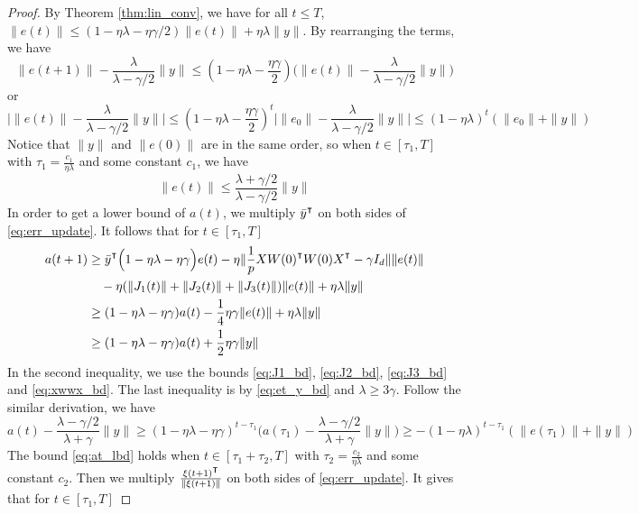 \begin{proof}
By Theorem \ref{thm:lin_conv}, we have for all $t\leq T$, $\|e(t)\|\leq(1-\eta\lambda-\eta\gamma/2)\|e(t)\|+\eta\lambda\|y\|$. By rearranging the terms, we have
\begin{equation*}
    \|e(t+1)\| -\frac{\lambda }{\lambda - \gamma/2}\|y\| \leq (1-\eta\lambda-\frac{\eta\gamma}{2})\Big(\|e(t)\| -\frac{\lambda }{\lambda - \gamma/2}\|y\|\Big)
\end{equation*}
or
\begin{equation*}
\Big|\|e(t)\| -\frac{\lambda }{\lambda - \gamma/2}\|y\|\Big|\leq (1-\eta\lambda-\frac{\eta\gamma}{2})^t \Big|\|e_0\|- \frac{\lambda }{\lambda - \gamma/2}\|y\|\Big| \leq (1-\eta\lambda)^t(\|e_0\|+\|y\|)
\end{equation*}
Notice that $\|y\|$ and $\|e(0)\|$ are in the same order, so when $t\in [\tau_1,T]$ with $\tau_1 = \frac{c_1}{\eta\lambda}$ and some constant $c_1$, we have
\begin{equation}
\label{eq:et_y_bd}
\|e(t)\|\leq \frac{\lambda+\gamma/2}{\lambda-\gamma/2} \|y\|
\end{equation}
In order to get a lower bound of $a(t)$, we multiply $\bar{y}\transpose$ on both sides of \eqref{eq:err_update}. It follows that for $t\in [\tau_1,T]$
\begin{equation*}
\begin{aligned}
a(t+1)
&\geq \bar{y}\transpose\Big(1-\eta\lambda-\eta\gamma\Big)e(t) - \eta\|\frac{1}{p}XW(0)\transpose W(0)X\transpose-\gamma I_d\|\|e(t)\|\\
&\quad-\eta(\|J_1(t)\|+\|J_2(t)\|+\|J_3(t)\|)\|e(t)\| +\eta\lambda\|y\|  \\
&\geq (1-\eta\lambda-\eta\gamma)a(t)- \frac{1}{4}\eta\gamma \|e(t)\| +\eta\lambda\|y\| \\
&\geq (1-\eta\lambda-\eta\gamma)a(t)+\frac{1}{2}\eta\gamma\|y\|
\end{aligned}
\end{equation*}
In the second inequality, we use the bounds \eqref{eq:J1_bd}, \eqref{eq:J2_bd}, \eqref{eq:J3_bd} and \eqref{eq:xwwx_bd}. The last inequality is by \eqref{eq:et_y_bd} and $\lambda\geq 3\gamma$. Follow the similar derivation, we have
\begin{equation*}
a(t) -\frac{\lambda - \gamma/2}{\lambda +\gamma}\|y\|\geq (1-\eta\lambda-\eta\gamma)^{t-\tau_1} \Big(a(\tau_1)- \frac{\lambda - \gamma/2}{\lambda +\gamma}\|y\|\Big) \geq -(1-\eta\lambda)^{t-\tau_1}(\|e(\tau_1)\|+\|y\|)
\end{equation*}
The bound \eqref{eq:at_lbd} holds when $t\in [\tau_1+\tau_2,T]$ with $\tau_2 = \frac{c_2}{\eta\lambda}$ and some constant $c_2$. Then we multiply $\frac{\xi(t+1)\transpose}{\|\xi(t+1)\|}$ on both sides of \eqref{eq:err_update}. It gives that for $t\in [\tau_1,T]$

\end{proof}
